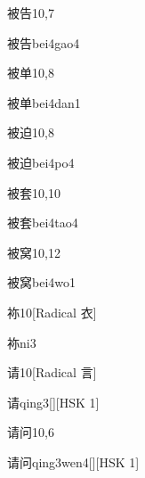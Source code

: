 \begin{entry}{被告}{10,7}
  \begin{phonetics}{被告}{bei4gao4}
  \end{phonetics}
\end{entry}

\begin{entry}{被单}{10,8}
  \begin{phonetics}{被单}{bei4dan1}
  \end{phonetics}
\end{entry}

\begin{entry}{被迫}{10,8}
  \begin{phonetics}{被迫}{bei4po4}
  \end{phonetics}
\end{entry}

\begin{entry}{被套}{10,10}
  \begin{phonetics}{被套}{bei4tao4}
  \end{phonetics}
\end{entry}

\begin{entry}{被窝}{10,12}
  \begin{phonetics}{被窝}{bei4wo1}
  \end{phonetics}
\end{entry}

\begin{entry}{袮}{10}[Radical 衣]
  \begin{phonetics}{袮}{ni3}
  \end{phonetics}
\end{entry}

\begin{entry}{请}{10}[Radical 言]
  \begin{phonetics}{请}{qing3}[][HSK 1]
  \end{phonetics}
\end{entry}

\begin{entry}{请问}{10,6}
  \begin{phonetics}{请问}{qing3wen4}[][HSK 1]
  \end{phonetics}
\end{entry}

